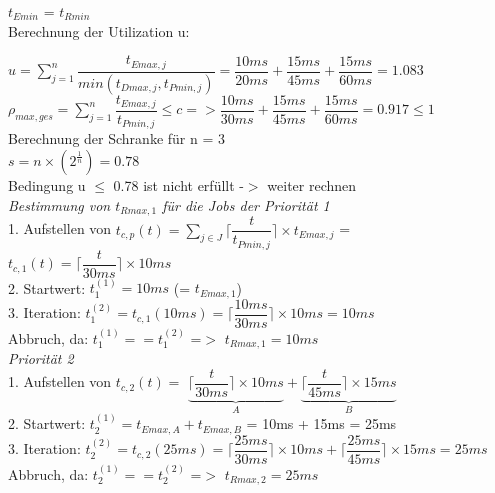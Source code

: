 \documentclass[12pt,a4paper,oneside,ngerman]{article}
\begin{document}
\(t_{Emin}\) = \(t_{Rmin}\)\\

Berechnung der Utilization u:

\(u = \displaystyle\sum_{j=1}^n \dfrac{t_{Emax,j}}{ min(t_{Dmax,j}, t_{Pmin,j})}  =  \dfrac{10ms}{20ms} + \dfrac{15ms}{45ms} + \dfrac{15ms}{60ms} = 1.083 \)\\
\(\rho_{max,ges} = \displaystyle\sum_{j=1}^n \dfrac{t_{Emax,j}}{t_{Pmin,j}} \leq c => \dfrac{10ms}{30ms} + \dfrac{15ms}{45ms} + \dfrac{15ms}{60ms} = 0.917 \leq 1\)\\

Berechnung der Schranke für n = 3 \\
\(s = n\times( 2^\frac{1}{n}) = 0.78\)\\

Bedingung u $\leq$ 0.78 ist nicht erfüllt -$>$ weiter rechnen\\

\emph{Bestimmung von \(t_{Rmax,1}\) für die Jobs der Priorität 1}\\
1. Aufstellen von \( t_{c,p}(t) = \displaystyle\sum_{j \in J} \Big\lceil \dfrac{t}{ t_{Pmin,j} } \Big\rceil \times t_{Emax,j} \) = \( t_{c,1}(t) = \Big\lceil \dfrac{t}{ 30ms } \Big\rceil \times 10ms \)\\
2. Startwert: \( t_{1}^{(1)} = 10ms \) (= \(t_{Emax,1}\)) \\
3. Iteration: \( t_{1}^{(2)} = t_{c,1}(10ms) = \Big\lceil \dfrac{10ms}{30ms} \Big\rceil \times 10ms = 10ms\)\\
Abbruch, da: \( t_{1}^{(1)} == t_{1}^{(2)} \) =$>$ \( t_{Rmax,1} = 10ms \)\\


\emph{Priorität 2}\\
1. Aufstellen von \( t_{c,2}(t) =\) \(\underbrace{\Big\lceil \dfrac{t}{ 30ms } \Big\rceil \times 10ms }_{A} + \underbrace{\Big\lceil \dfrac{t}{ 45ms } \Big\rceil \times 15ms}_{B}\) \\
2. Startwert: \( t_{2}^{(1)} = t_{Emax,A} + t_{Emax,B} \) = 10ms + 15ms = 25ms \\
3. Iteration: \( t_{2}^{(2)} = t_{c,2}(25ms) = \Big\lceil \dfrac{25ms}{30ms} \Big\rceil \times 10ms + \Big\lceil \dfrac{25ms}{45ms} \Big\rceil \times 15ms = 25ms\)\\
Abbruch, da: \( t_{2}^{(1)} == t_{2}^{(2)} \) =$>$ \( t_{Rmax,2} = 25ms \)\\
\end{document}
